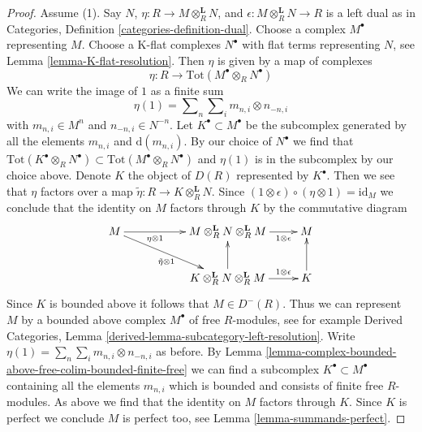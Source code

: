 \documentclass[10pt,a4paper]{amsart}
\theoremstyle{plain}
\theoremstyle{definition}
\theoremstyle{remark}
\numberwithin{equation}{subsection}
\begin{document}
\begin{proof}
\medskip\noindent
Assume (1). Say $N$, $\eta : R \to M \otimes_R^\mathbf{L} N$, and
$\epsilon : M \otimes_R^\mathbf{L} N \to R$ is a left dual
as in Categories, Definition \ref{categories-definition-dual}.
Choose a complex $M^\bullet$ representing $M$. Choose a
K-flat complexes $N^\bullet$ with flat terms
representing $N$, see Lemma \ref{lemma-K-flat-resolution}.
Then $\eta$ is given by a map of complexes
$$
\eta : R \longrightarrow \text{Tot}(M^\bullet \otimes_R N^\bullet)
$$
We can write the image of $1$ as a finite sum
$$
\eta(1) = \sum\nolimits_n \sum\nolimits_i m_{n, i} \otimes n_{-n, i}
$$
with $m_{n, i} \in M^n$ and $n_{-n, i} \in N^{-n}$. Let
$K^\bullet \subset M^\bullet$ be the subcomplex
generated by all the elements $m_{n, i}$ and $\text{d}(m_{n, i})$.
By our choice of $N^\bullet$ we find that
$\text{Tot}(K^\bullet \otimes_R N^\bullet) \subset
\text{Tot}(M^\bullet \otimes_R N^\bullet)$ and
$\eta(1)$ is in the subcomplex by our choice above.
Denote $K$ the object of $D(R)$ represented by $K^\bullet$.
Then we see that $\eta$ factors over a map
$\tilde \eta : R \longrightarrow K \otimes_R^\mathbf{L} N$.
Since
$(1 \otimes \epsilon) \circ (\eta \otimes 1) = \text{id}_M$
we conclude that the identity on $M$ factors through $K$
by the commutative diagram
$$
\xymatrix{
M \ar[rr]_-{\eta \otimes 1} \ar[rrd]_{\tilde \eta \otimes 1} & &
M \otimes_R^\mathbf{L} N \otimes_R^\mathbf{L} M
\ar[r]_-{1 \otimes \epsilon} &
M \\
& &
K \otimes_R^\mathbf{L} N \otimes_R^\mathbf{L} M
\ar[u] \ar[r]^-{1 \otimes \epsilon} &
K \ar[u]
}
$$
Since $K$ is bounded above it follows that $M \in D^-(R)$.
Thus we can represent $M$ by a bounded above complex
$M^\bullet$ of free $R$-modules, see for example
Derived Categories, Lemma \ref{derived-lemma-subcategory-left-resolution}.
Write $\eta(1) = \sum\nolimits_n \sum\nolimits_i m_{n, i} \otimes n_{-n, i}$
as before.
By Lemma \ref{lemma-complex-bounded-above-free-colim-bounded-finite-free}
we can find a subcomplex $K^\bullet \subset M^\bullet$
containing all the elements $m_{n, i}$
which is bounded and consists of finite free $R$-modules.
As above we find that the identity on $M$ factors through $K$.
Since $K$ is perfect we conclude $M$ is perfect too, see
Lemma \ref{lemma-summands-perfect}.
\end{proof}
\end{document}

